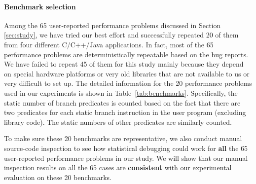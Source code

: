 \paragraph{Benchmark selection}
Among the 65 user-reported performance problems discussed in Section 
\ref{sec:study}, we have tried our best effort and successfully repeated 20
of them from four different C/C++/Java 
applications. In fact, most of the 65 performance problems are deterministically repeatable based on the bug reports.
We have failed to repeat 45 of them for this
study mainly because they depend on special hardware platforms or very
old libraries that are not available to us or very difficult to set up. 
The detailed information for the 20 performance problems used in our experiments 
is shown in Table~\ref{tab:benchmarks}.
Specifically, the static number of branch predicates is counted based on the 
fact that
there are two predicates for each static branch instruction in the user program
(excluding library code). The static numbers of other predicates are similarly
counted.

To make sure these 20 benchmarks are representative, we also conduct
manual source-code inspection to see how statistical debugging could work
for \textbf{all} the 65 user-reported performance problems in our study. 
We will show that our
manual inspection results on all the 65 cases are \textbf{consistent} with
our experimental evaluation on these 20 benchmarks. 

%




